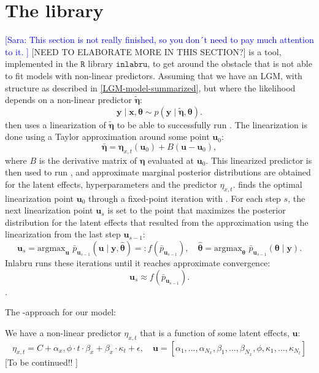 \newpage
\section{The \inlabru library}
\textcolor{blue}{[Sara: This section is not really finished, so you don´t need to pay much attention to it. ]}
[NEED TO ELABORATE MORE IN THIS SECTION?]
\inlabru is a tool, implemented in the $\texttt{R}$ library $\texttt{inlabru}$, to get around the obstacle that \inla is not able to fit models with non-linear predictors. 
Assuming that we have an LGM, with structure as described in \ref{LGM-model-summarized}, but where the likelihood depends on a non-linear predictor $\tilde{\boldsymbol{\eta}}$:
\begin{equation}
    \textbf{y}\mid\textbf{x},\boldsymbol{\theta} \sim p(\textbf{y}\mid \tilde{\boldsymbol{\eta}}, \boldsymbol{\theta}).
    \label{Eq:non-linear-predictor}
\end{equation}
\inlabru then uses a linearization of $\tilde{\boldsymbol{\eta}}$ to be able to successfully run \inla. The linearization is done using a Taylor approximation around some point $\textbf{u}_0$:
\begin{equation}
    \bar{\boldsymbol{\eta}} = \boldsymbol{\eta}_{x,t}(\textbf{u}_0) + B(\textbf{u} - \textbf{u}_0),
\end{equation}
where $B$ is the derivative matrix of $\boldsymbol{\eta}$ evaluated at $\textbf{u}_0$. This linearized predictor is then used to run \inla, and approximate marginal posterior distributions are obtained for the latent effects, hyperparameters and the predictor $\eta_{x,t}$. 
\inlabru finds the optimal linearization point $\textbf{u}_0$ through a fixed-point iteration with \inla. For each step $s$, the next linearization point $\textbf{u}_s$ is set to the point that maximizes the posterior distribution for the latent effects that resulted from the \inla approximation using the linearization from the last step $\textbf{u}_{s-1}$:
\begin{equation}
\textbf{u}_{s} = \text{argmax}_{\textbf{u}}\,\,\bar{p}_{\textbf{u}_{s-1}}(\textbf{u}\mid \textbf{y}, \hat{\boldsymbol{\theta}}) =: f(\bar{p}_{\textbf{u}_{s-1}}), \quad \hat{\boldsymbol{\theta}} = \text{argmax}_{\boldsymbol{\theta}}\,\,\bar{p}_{\textbf{u}_{s-1}}(\boldsymbol{\theta}\mid \textbf{y}).
\end{equation}
Inlabru runs these iterations until it reaches approximate convergence:
\begin{equation}
\textbf{u}_s \approx f(\bar{p}_{\textbf{u}_{s-1}}).
\end{equation}\cite{Inlabru}.

The \inlabru-approach for our model:

We have a non-linear predictor $\eta_{x,t}$ that is a function of some latent effects, $\textbf{u}$:
\begin{equation}
    \eta_{x,t} = C + \alpha_x, \phi\cdot t\cdot \beta_x + \beta_x\cdot\kappa_t + \epsilon, \quad \textbf{u} = [\alpha_1,...,\alpha_{N_x},\beta_1,...,\beta_{N_x},\phi,\kappa_1,...,\kappa_{N_t}]
\end{equation}
[To be continued!! ]
